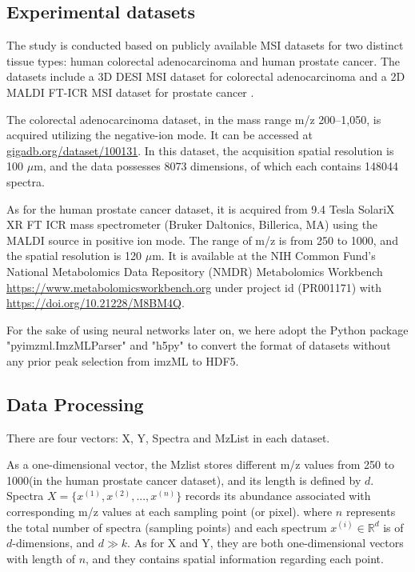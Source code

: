 \documentclass[journal=jacsat,manuscript=article]{achemso}
\begin{document}
\subsection{Experimental datasets} 


The study is conducted based on publicly available MSI datasets for
two distinct tissue types: human colorectal adenocarcinoma and human 
prostate cancer. The datasets include a 3D DESI MSI dataset for colorectal 
adenocarcinoma \cite{oetjen2015benchmark} and a 
2D MALDI FT-ICR MSI dataset for prostate cancer \cite{abdelmoula2021peak}.

The colorectal adenocarcinoma dataset, 
in the mass range m/z 200–1,050, is acquired utilizing the negative-ion 
mode. It can be accessed
at \href{http://gigadb.org/dataset/100131}{gigadb.org/dataset/100131}.
In this dataset, the acquisition spatial resolution is 100 $\mu$m, 
and the data possesses 8073 dimensions, of which each contains 148044 spectra.

As for the human prostate cancer dataset, it is acquired from
9.4 Tesla SolariX XR FT ICR mass spectrometer (Bruker Daltonics, Billerica, MA) 
using the MALDI source in positive ion mode. The range of m/z is from 250 to 1000, 
and the spatial resolution is 120 $\mu$m. 
It is available at the NIH Common Fund’s National Metabolomics Data Repository (NMDR) Metabolomics 
Workbench \href{https://www.metabolomicsworkbench.org}{https://www.metabolomicsworkbench.org} 
under project id (PR001171) with \href{https://doi.org/10.21228/M8BM4Q}{https://doi.org/10.21228/M8BM4Q}.

For the sake of using neural networks later on, we here adopt the Python package "pyimzml.ImzMLParser" 
and "h5py" to convert the format of datasets without any prior peak selection from imzML \cite{race2012inclusive} to HDF5.

\subsection{Data Processing}
There are four vectors: X, Y, Spectra and MzList in each dataset.

As a one-dimensional vector, the Mzlist stores different m/z values from 250 to 1000(in the human prostate cancer dataset),
and its length is defined by $d$.  
Spectra $ X = \{ x^{(1)},x^{(2)},...,x^{(n)}\}$ records its abundance associated with 
corresponding m/z values at each sampling point (or pixel). where $n$ represents the 
total number of spectra (sampling points) and each spectrum $x^{(i)} \in \mathbb{R} ^{d}$ 
is of $d$-dimensions, and $d \gg k$. As for X and Y, they are both one-dimensional vectors with length of $n$, and they 
contains spatial information regarding each point. 
\end{document}
